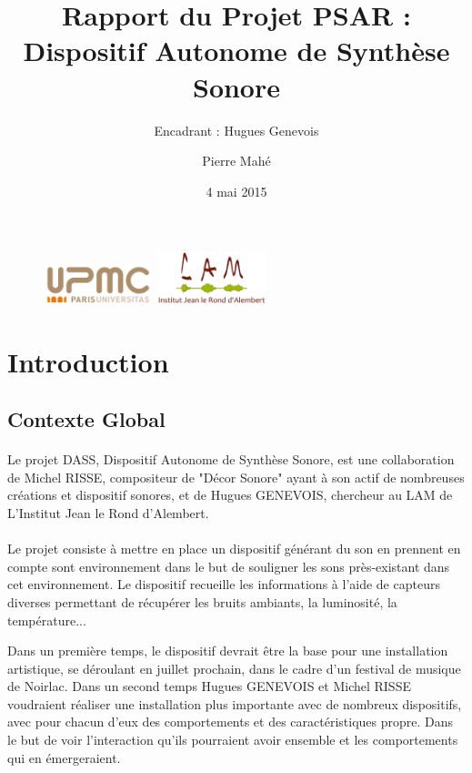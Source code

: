 \documentclass[a4paper, titlepage, oneside, 12pt]{article}%
\title{Rapport du Projet PSAR :\\ Dispositif Autonome de Synthèse Sonore}
\subtitle{Encadrant : Hugues Genevois}
\author{Pierre Mahé}
\date{4 mai 2015}
\begin{document}
  
 \begin{figure}[b]
	\includegraphics[width=120px] {upmc_logo.jpg}
	\hspace{7cm}
	\vspace{-2cm}
	\includegraphics[width=120px] {LogoLAM.jpg}
\end{figure}

\maketitle 
\tableofcontents

\newpage
\section{Introduction}
\subsection{Contexte Global}

\paragraph{}
Le projet DASS, Dispositif Autonome de Synthèse Sonore, est une collaboration de Michel RISSE, compositeur de "Décor Sonore" ayant à son actif de nombreuses créations et dispositif sonores, et de Hugues GENEVOIS, chercheur au LAM de L'Institut Jean le Rond d'Alembert.

\paragraph{}
Le projet consiste à mettre en place un dispositif générant du son en prennent en compte sont environnement dans le but de souligner les sons près-existant dans cet environnement. Le dispositif recueille les informations à l'aide de capteurs diverses permettant de récupérer les bruits ambiants, la luminosité, la température...

Dans un première temps, le dispositif devrait être la base pour une installation artistique, se déroulant en juillet prochain, dans le cadre d'un festival de musique de Noirlac. Dans un second temps Hugues GENEVOIS et Michel RISSE voudraient réaliser une installation plus importante avec de nombreux dispositifs, avec pour chacun d'eux des comportements et des caractéristiques propre. Dans le but de voir l’interaction qu'ils pourraient avoir ensemble et les comportements qui en émergeraient.
\end{document}
